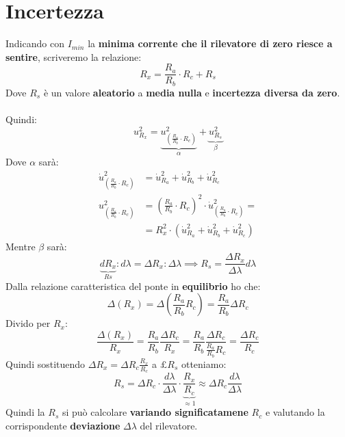 \section{Incertezza}
Indicando con $I_{min}$ la \textbf{minima corrente che il rilevatore di zero riesce a sentire}, scriveremo la relazione:
\begin{equation*}
    R_x = \frac{R_a}{R_b} \cdot R_c + R_s
\end{equation*}
Dove $R_s$ è un valore \textbf{aleatorio} a \textbf{media nulla} e \textbf{incertezza diversa da zero}.\\ \\
Quindi:
\begin{equation*}
    u^2_{R_x} = \underbrace{u^2_{\left(\frac{R_a}{R_b} \cdot R_c\right)}}_{\alpha} + \underbrace{u^2_{R_s}}_{\beta}
\end{equation*}
Dove $\alpha$ sarà:
\begin{equation*}
\begin{aligned}
    \dot{u}^2_{\left(\frac{R_a}{R_b} \cdot R_c\right)} &= \dot{u}^2_{R_a} + \dot{u}^2_{R_b} + \dot{u}^2_{R_c}\\
    {u}^2_{\left(\frac{R_a}{R_b} \cdot R_c\right)} &= \left(\frac{R_a}{R_b} \cdot R_c \right)^2 \cdot \dot{u}^2_{\left(\frac{R_a}{R_b} \cdot R_c\right)} = \\
    &= R^2_x \cdot \left(\dot{u}^2_{R_a} + \dot{u}^2_{R_b} + \dot{u}^2_{R_c}\right)
\end{aligned}
\end{equation*}
Mentre $\beta$ sarà:
\begin{equation*}
    \underbrace{dR_x}_{Rs} : d\lambda = \Delta R_x : \Delta \lambda \implies R_s = \frac{\Delta R_x}{\Delta \lambda} d\lambda
\end{equation*}
Dalla relazione caratteristica del ponte in \textbf{equilibrio} ho che:
\begin{equation*}
    \Delta (R_x) = \Delta \left(\frac{R_a}{R_b} R_c\right) = \frac{R_a}{R_b} \Delta R_c
\end{equation*}
Divido per $R_x$:
\begin{equation*}
    \frac{\Delta (R_x)}{R_x} = \frac{R_a}{R_b} \frac{\Delta R_c}{R_x} = \frac{R_a}{R_b} \frac{\Delta R_c}{ \frac{R_a}{R_b} R_c} = \frac{\Delta R_c}{R_c}
\end{equation*}
Quindi sostituendo $\Delta R_x = \Delta R_c \frac{R_x}{R_c}$ a $£
R_s$ otteniamo:
\begin{equation*}
    R_s = \Delta R_c \cdot \frac{d \lambda}{\Delta \lambda} \cdot \underbrace{\frac{R_x}{R_c}}_{\approx 1} \approx \Delta R_c \frac{d \lambda}{\Delta \lambda}
\end{equation*}
Quindi la $R_s$ si può calcolare \textbf{variando significatamene} $R_c$ e valutando la corrispondente \textbf{deviazione} $\Delta \lambda$ del rilevatore.
